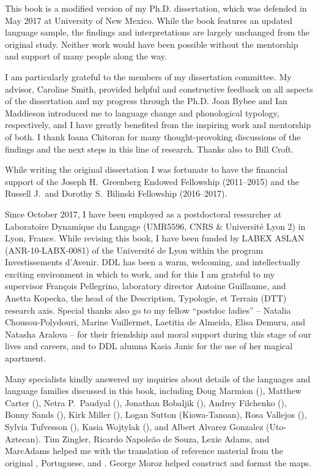 \addchap{\lsAcknowledgementTitle} 

This book is a modified version of my Ph.D. dissertation, which was defended in May 2017 at University of New Mexico. While the book features an updated language sample, the findings and interpretations are largely unchanged from the original study. Neither work would have been possible without the mentorship and support of many people along the way.

I am particularly grateful to the members of my dissertation committee. My advisor, Caroline Smith, provided helpful and constructive feedback on all aspects of the dissertation and my progress through the Ph.D. Joan Bybee and Ian Maddieson introduced me to language change and phonological typology, respectively, and I have greatly benefited from the inspiring work and mentorship of both. I thank Ioana Chitoran for many thought-provoking discussions of the findings and the next steps in this line of research. Thanks also to Bill Croft.

While writing the original dissertation I was fortunate to have the financial support of the Joseph H.\ Greenberg Endowed Fellowship (2011--2015) and the Russell J.\ and Dorothy S.\ Bilinski Fellowship (2016--2017).

Since October 2017, I have been employed as a postdoctoral researcher at Laboratoire Dynamique du Langage (UMR5596, CNRS \& Université Lyon 2) in Lyon, France. While revising this book, I have been funded by LABEX ASLAN (ANR-10-LABX-0081) of the Université de Lyon within the  program Investissements d’Avenir. DDL has been a warm, welcoming, and intellectually exciting environment in which to work, and for this I am grateful to my supervisor François Pellegrino, laboratory director Antoine Guillaume, and Anetta Kopecka, the head of the Description, Typologie, et Terrain (DTT) research axis. Special thanks also go to my fellow ``postdoc ladies'' -- Natalia Chousou-Polydouri, Marine Vuillermet, Laetitia de Almeida, Elisa Demuru, and Natasha Aralova -- for their friendship and moral support during this stage of our lives and careers, and to DDL alumna Kasia Janic for the use of her magical apartment.

Many specialists kindly answered my inquiries about details of the languages and language families discussed in this book, including Doug Marmion (), Matthew Carter (), Netra P.\ Paudyal (), Jonathan Bobaljik (), Andrey Filchenko (), Bonny Sands (), Kirk Miller (), Logan Sutton (Kiowa-Tanoan), Rosa Vallejos (), Sylvia Tufvesson (), Kasia Wojtylak (), and Albert Alvarez Gonzalez (Uto-Az\-tecan). Tim Zingler, Ricardo Napoleão de Souza, Lexie Adams, and Marc\linebreak Adams helped me with the translation of reference material from the original , Portuguese, and . George Moroz helped construct and format the maps.

